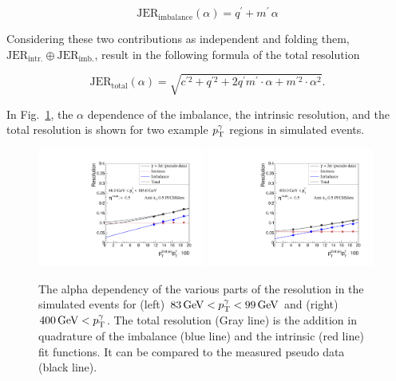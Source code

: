 \begin{equation}\label{eq:imbalance}
  \text{JER}_{\text{imbalance}} \left( \alpha\right) = q^{\prime} + m^{\prime} \, \alpha
\end{equation}

Considering these two contributions as independent and folding them, $\text{JER}_{\text{intr.}} \oplus \text{JER}_{\text{imb.}}$, result in the following formula of the total resolution

\begin{equation}\label{eq:total}
  \text{JER}_{\text{total}} \left( \alpha \right) = \sqrt{ c^{\prime 2} + q^{\prime 2}  + 2 q^{\prime} m^{\prime} \cdot \alpha +m^{\prime 2} \cdot \alpha^2}. 
\end{equation}


In \mbox{Fig. \ref{fig:AlphaDependenceOfResolutions}}, the $\alpha$ dependence of the imbalance, the intrinsic resolution, and the total resolution is shown for two example 
$p_{\text{T}}^{\gamma}$ regions in simulated events. 
\begin{figure}[tbp]
 \centering
    \includegraphics[width=0.49\textwidth]{figures/resolution/methodology/JER_for_1_eta_bin_4_pTGamma_bin_all_contributions_PFCHS_RMS99_mc.pdf} 
    \includegraphics[width=0.49\textwidth]{figures/resolution/methodology/JER_for_1_eta_bin_12_pTGamma_bin_all_contributions_PFCHS_RMS99_mc.pdf} 
  \caption{The alpha dependency of the various parts of the resolution in the simulated events for (left) $83 \,\text{Ge}\kern-0.06667em\text{V} < p_{\text{T}}^{\gamma} < 99 \,\text{Ge}\kern-0.06667em\text{V} $ and (right) $400 \,\text{Ge}\kern-0.06667em\text{V} < p_{\text{T}}^{\gamma}$. The total resolution (Gray line) is the addition in quadrature of the imbalance (blue line) and the intrinsic (red line) 
  fit functions. It can 
  be compared to the measured pseudo data (black line).}  
 \label{fig:AlphaDependenceOfResolutions}
\end{figure}
